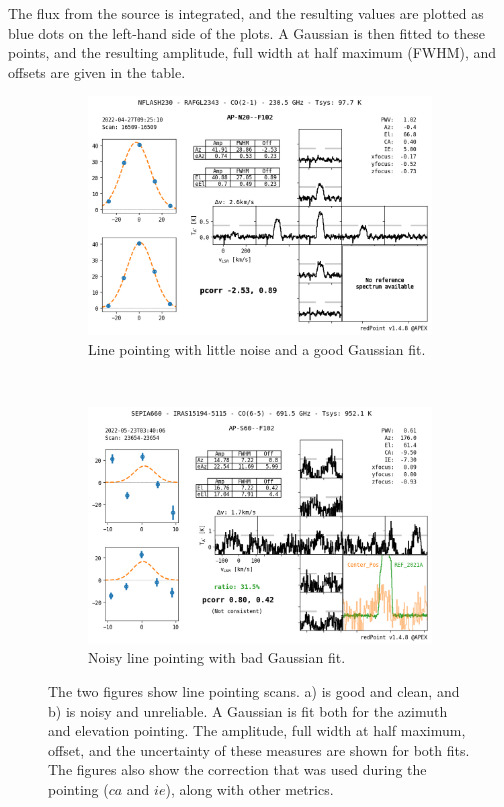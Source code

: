 The flux from the source is integrated, and the resulting values are plotted as blue dots on the left-hand side of the plots.
A Gaussian is then fitted to these points, and the resulting amplitude, full width at half maximum (FWHM), and offsets are given in the table.

\begin{figure}[H]
    \centering
     \begin{subfigure}[b]{0.75\textwidth}
         \centering
         \includegraphics[width=\textwidth]{Pointing Scans/good_line.png}
         \caption{Line pointing with little noise and a good Gaussian fit.}
         \label{subfig:good_line}
     \end{subfigure}
    \\
     \begin{subfigure}[b]{0.75\textwidth}
         \centering
         \includegraphics[width=\textwidth]{Pointing Scans/bad_line.png}
         \caption{Noisy line pointing with bad Gaussian fit.}
         \label{subfig:bad_line}
     \end{subfigure}
    \caption{The two figures show line pointing scans. a) is good and clean, and b) is noisy and unreliable. A Gaussian is fit both for the azimuth and elevation pointing.
    The amplitude, full width at half maximum, offset, and the uncertainty of these measures are shown for both fits.
    The figures also show the correction that was used during the pointing ($ca$ and $ie$), along with other metrics.}
    \label{fig:line_pointings}
\end{figure}

